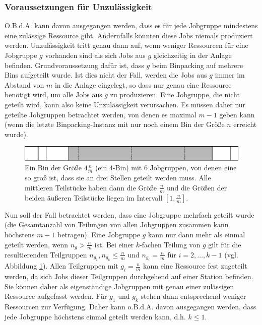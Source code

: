\documentclass{scrreprt}
\begin{document}
\subsubsection{Voraussetzungen für Unzulässigkeit}
O.B.d.A. kann davon ausgegangen werden, dass es für jede Jobgruppe mindestens eine zulässige Ressource gibt.
Andernfalls könnten diese Jobs niemals produziert werden.
Unzulässigkeit tritt genau dann auf, wenn weniger Ressourcen für eine Jobgruppe $g$ vorhanden sind als sich Jobs aus $g$ gleichzeitig in der Anlage befinden.
Grundvoraussetzung dafür ist, dass $g$ beim Binpacking auf mehrere Bins aufgeteilt wurde.
Ist dies nicht der Fall, werden die Jobs aus $g$ immer im Abstand von $m$ in die Anlage eingelegt,
so dass nur genau eine Ressource benötigt wird, um alle Jobs aus $g$ zu produzieren.
Eine Jobgruppe, die nicht geteilt wird, kann also keine Unzulässigkeit verursachen.
Es müssen daher nur geteilte Jobgruppen betrachtet werden, von denen es maximal $m-1$ geben kann
(wenn die letzte Binpacking-Instanz mit nur noch einem Bin der Größe $n$ erreicht wurde).

\begin{figure}
    \begin{center}
        \includegraphics[width=.8\textwidth]{graphics/kteilung.pdf}
    \end{center}
    \caption{
        \label{abb:kteilung}
        Ein Bin der Größe $4\frac{n}{m}$ (ein $4$-Bin) mit $6$ Jobgruppen, von denen eine so groß ist,
        dass sie an drei Stellen geteilt werden muss.
        Alle mittleren Teilstücke haben dann die Größe $\frac{n}{m}$ und die Größen der beiden äußeren
        Teilstücke liegen im Intervall $[1,\frac{n}{m}]$.
    }
\end{figure}
Nun soll der Fall betrachtet werden, dass eine Jobgruppe mehrfach geteilt wurde 
(die Gesamtanzahl von Teilungen von allen Jobgruppen zusammen kann höchstens $m-1$ betragen).
Eine Jobgruppe $g$ kann nur dann mehr als einmal geteilt werden, wenn $n_g > \frac{n}{m}$ ist.
Bei einer $k$-fachen Teilung von $g$ gilt für die resultierenden Teilgruppen $n_{g_1},n_{g_k}\leq\frac{n}{m}$ und $n_{g_i}=\frac{n}{m}$ für $i=2,\ldots,k-1$
(vgl. Abbildung \ref{abb:kteilung}).
Allen Teilgruppen mit $g_i=\frac{n}{m}$ kann eine Ressource fest zugeteilt werden, da sich Jobs dieser Teilgruppen durchgehend auf einer Station befinden.
Sie können daher als eigenständige Jobgruppen mit genau einer zulässigen Ressource aufgefasst werden.
Für $g_1$ und $g_k$ stehen dann entsprechend weniger Ressourcen zur Verfügung.
Daher kann o.B.d.A. davon ausgegangen werden, dass jede Jobgruppe höchstens einmal geteilt werden kann, d.h. $k\leq 1$.
\end{document}
